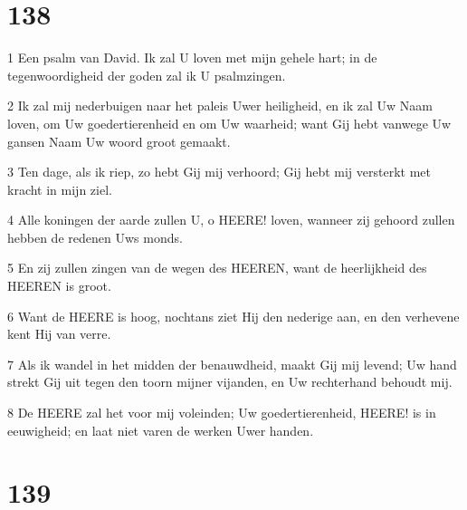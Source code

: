 \chapter{138}

\par 1 Een psalm van David. Ik zal U loven met mijn gehele hart; in de tegenwoordigheid der goden zal ik U psalmzingen.
\par 2 Ik zal mij nederbuigen naar het paleis Uwer heiligheid, en ik zal Uw Naam loven, om Uw goedertierenheid en om Uw waarheid; want Gij hebt vanwege Uw gansen Naam Uw woord groot gemaakt.
\par 3 Ten dage, als ik riep, zo hebt Gij mij verhoord; Gij hebt mij versterkt met kracht in mijn ziel.
\par 4 Alle koningen der aarde zullen U, o HEERE! loven, wanneer zij gehoord zullen hebben de redenen Uws monds.
\par 5 En zij zullen zingen van de wegen des HEEREN, want de heerlijkheid des HEEREN is groot.
\par 6 Want de HEERE is hoog, nochtans ziet Hij den nederige aan, en den verhevene kent Hij van verre.
\par 7 Als ik wandel in het midden der benauwdheid, maakt Gij mij levend; Uw hand strekt Gij uit tegen den toorn mijner vijanden, en Uw rechterhand behoudt mij.
\par 8 De HEERE zal het voor mij voleinden; Uw goedertierenheid, HEERE! is in eeuwigheid; en laat niet varen de werken Uwer handen.

\chapter{139}

